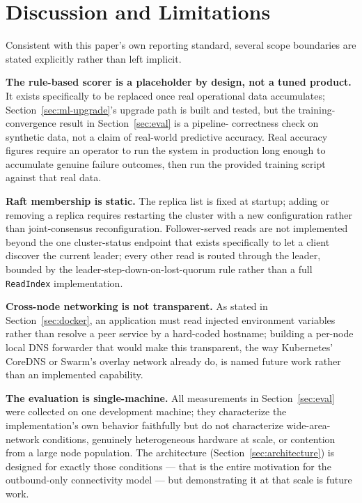 \documentclass[conference]{IEEEtran}
\begin{document}
\section{Discussion and Limitations}
\label{sec:discussion}

Consistent with this paper's own reporting standard, several scope boundaries are stated explicitly
rather than left implicit.

\textbf{The rule-based scorer is a placeholder by design, not a tuned product.} It exists specifically
to be replaced once real operational data accumulates; Section~\ref{sec:ml-upgrade}'s upgrade path is
built and tested, but the training-convergence result in Section~\ref{sec:eval} is a pipeline-
correctness check on synthetic data, not a claim of real-world predictive accuracy. Real accuracy
figures require an operator to run the system in production long enough to accumulate genuine failure
outcomes, then run the provided training script against that real data.

\textbf{Raft membership is static.} The replica list is fixed at startup; adding or removing a
replica requires restarting the cluster with a new configuration rather than joint-consensus
reconfiguration. Follower-served reads are not implemented beyond the one cluster-status endpoint
that exists specifically to let a client discover the current leader; every other read is routed
through the leader, bounded by the leader-step-down-on-lost-quorum rule rather than a full
\texttt{ReadIndex} implementation.

\textbf{Cross-node networking is not transparent.} As stated in Section~\ref{sec:docker}, an
application must read injected environment variables rather than resolve a peer service by a
hard-coded hostname; building a per-node local DNS forwarder that would make this transparent, the way
Kubernetes' CoreDNS or Swarm's overlay network already do, is named future work rather than an
implemented capability.

\textbf{The evaluation is single-machine.} All measurements in Section~\ref{sec:eval} were collected
on one development machine; they characterize the implementation's own behavior faithfully but do not
characterize wide-area-network conditions, genuinely heterogeneous hardware at scale, or contention
from a large node population. The architecture (Section~\ref{sec:architecture}) is designed for
exactly those conditions — that is the entire motivation for the outbound-only connectivity model —
but demonstrating it at that scale is future work.
\end{document}
